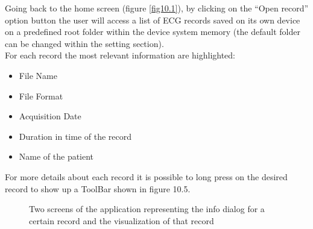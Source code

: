 Going back to the home screen (figure \ref{fig10.1}), by clicking on the “Open record” option button the user will access a list of ECG records saved on its own device on a predefined root folder within the device system memory (the default folder can be changed within the setting section).\\
For each record the most relevant information are highlighted:
\begin{itemize}
	\item File Name
	\item File Format
	\item Acquisition Date
	\item Duration in time of the record
	\item Name of the patient
\end{itemize}	
For more details about each record it is possible to long press on the desired record to show up a ToolBar shown in figure 10.5.
\newpage
\begin{figure}[!htb]
	\centering
	\qquad 
	\caption{Two screens of the application representing the info dialog for a certain record and the visualization of that record}  
	\label{fig10.5ab}
\end{figure}
